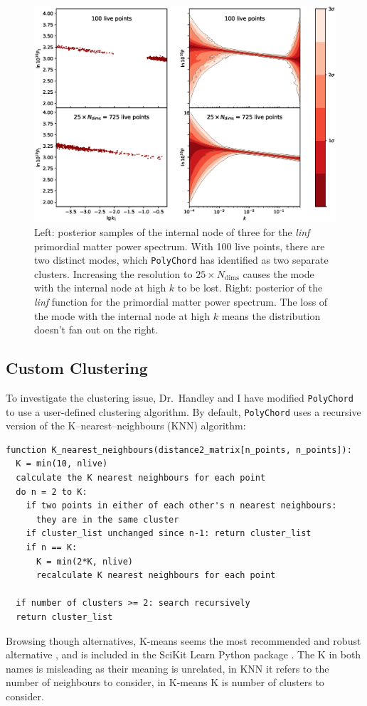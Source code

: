 \documentclass{article}
\begin{document}
\begin{figure}[!ht]
  \centering
  \includegraphics[width=15cm]{N3comparison.eps}
  \caption{Left: posterior samples of the internal node of three for the \textit{linf} primordial matter power spectrum. With 100 live points, there are two distinct modes, which \texttt{PolyChord} has identified as two separate clusters. Increasing the resolution to $25 \times N_\textrm{dims}$ causes the mode with the internal node at high $k$ to be lost. Right: posterior of the \textit{linf} function for the primordial matter power spectrum. The loss of the mode with the internal node at high $k$ means the distribution doesn't fan out on the right.}
  \label{fig:N3}
\end{figure}

\newpage

\subsection{Custom Clustering}
To investigate the clustering issue, Dr.~Handley and I have modified \texttt{PolyChord} to use a user-defined clustering algorithm. By default, \texttt{PolyChord} uses a recursive version of the K--nearest--neighbours (KNN) algorithm:
\begin{verbatim}
function K_nearest_neighbours(distance2_matrix[n_points, n_points]):
  K = min(10, nlive)
  calculate the K nearest neighbours for each point
  do n = 2 to K:
    if two points in either of each other's n nearest neighbours: 
      they are in the same cluster
    if cluster_list unchanged since n-1: return cluster_list
    if n == K: 
      K = min(2*K, nlive)
      recalculate K nearest neighbours for each point
    
  if number of clusters >= 2: search recursively
  return cluster_list
\end{verbatim}
Browsing though alternatives, K-means seems the most recommended and robust alternative \cite{MacKay2003}, and is included in the SciKit Learn Python package \cite{scikit-learn}. The K in both names is misleading as their meaning is unrelated, in KNN it refers to the number of neighbours to consider, in K-means K is number of clusters to consider.
\end{document}
